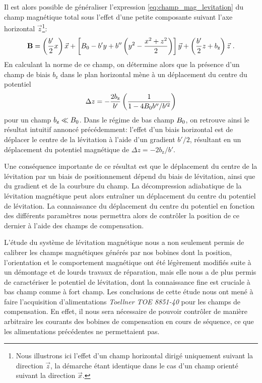 Il est alors possible de généraliser l'expression \ref{eq:champ_mag_levitation} du champ magnétique total sous l'effet d'une petite composante suivant l'axe horizontal $\vec{z}$\footnote{Nous illustrons ici l'effet d'un champ horizontal dirigé uniquement suivant la direction $\vec{z}$, la démarche étant identique dans le cas d'un champ orienté suivant la direction $\vec{x}$.}:
\begin{equation}
\mathbf{B}=\left( \frac{b'}{2}x \right) \vec{x} + \left[ B_0 - b'y + b'' \left( y^2 - \frac{x^2+z^2}{2} \right) \right] \vec{y} + \left( \frac{b'}{2}z +b_{\mathrm{z}} \right) \vec{z} \text{ .}
\end{equation}
En calculant la norme de ce champ, on détermine alors que la présence d'un champ de biais $b_{\mathrm{z}}$ dans le plan horizontal mène à un déplacement du centre du potentiel
\begin{equation}
\Delta z =-\frac{2b_{\mathrm{z}}}{b'}\left( \frac{1}{1-4B_0 b'' /b'^2} \right)
\end{equation}
pour un champ $b_{\mathrm{z}} \ll B_0$. Dans le régime de bas champ $B_0$, on retrouve ainsi le résultat intuitif annoncé précédemment: l'effet d'un biais horizontal est de déplacer le centre de la lévitation à l'aide d'un gradient $b'/2$, résultant en un déplacement du potentiel magnétique de $\Delta z =-2b_{\mathrm{z}}/b'$. 

Une conséquence importante de ce résultat est que le déplacement du centre de la lévitation par un biais de positionnement dépend du biais de lévitation, ainsi que du gradient et de la courbure du champ. La décompression adiabatique de la lévitation magnétique peut alors entraîner un déplacement du centre du potentiel de lévitation. La connaissance du déplacement du centre du potentiel en fonction des différents paramètres nous permettra alors de contrôler la position de ce dernier à l'aide des champs de compensation.

L'étude du système de lévitation magnétique nous a non seulement permis de calibrer les champs magnétiques générés par nos bobines dont la position, l'orientation et le comportement magnétique ont été légèrement modifiés suite à un démontage et de lourds travaux de réparation, mais elle nous a de plus permis de caractériser le potentiel de lévitation, dont la connaissance fine est cruciale à bas champ comme à fort champ. Les conclusions de cette étude nous ont mené à faire l'acquisition d'alimentations \emph{Toellner TOE 8851-40} pour les champs de compensation. En effet, il nous sera nécessaire de pouvoir contrôler de manière arbitraire les courants des bobines de compensation en cours de séquence, ce que les alimentations précédentes ne permettaient pas.





